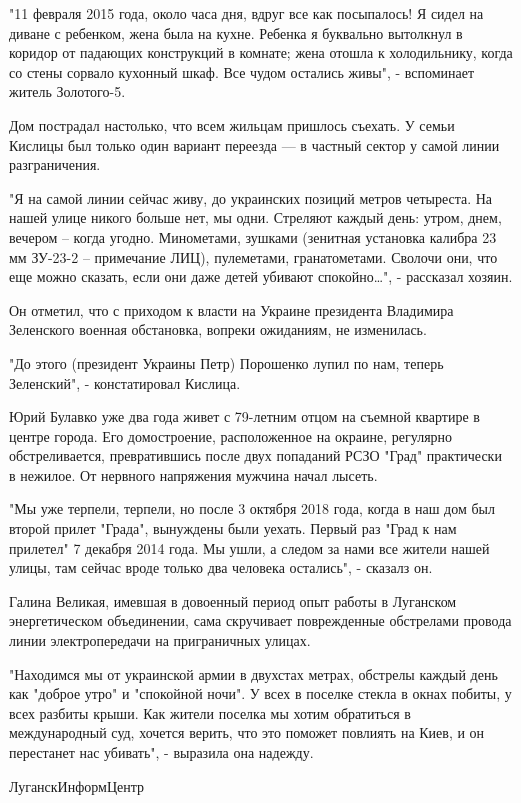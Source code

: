 \documentclass[a4paper,11pt]{extreport}
\begin{document}
"11 февраля 2015 года, около часа дня, вдруг все как посыпалось! Я сидел на
диване с ребенком, жена была на кухне. Ребенка я буквально вытолкнул в коридор
от падающих конструкций в комнате; жена отошла к холодильнику, когда со стены
сорвало кухонный шкаф. Все чудом остались живы", - вспоминает житель
Золотого-5. 

Дом пострадал настолько, что всем жильцам пришлось съехать. У семьи Кислицы был
только один вариант переезда --- в частный сектор у самой линии разграничения. 

"Я на самой линии сейчас живу, до украинских позиций метров четыреста. На нашей
улице никого больше нет, мы одни. Стреляют каждый день: утром, днем, вечером –
когда угодно. Минометами, зушками (зенитная установка калибра 23 мм ЗУ-23-2 –
примечание ЛИЦ), пулеметами, гранатометами. Сволочи они, что еще можно сказать,
если они даже детей убивают спокойно…", - рассказал хозяин. 

Он отметил, что с приходом к власти на Украине президента Владимира Зеленского
военная обстановка, вопреки ожиданиям, не изменилась. 

"До этого (президент Украины Петр) Порошенко лупил по нам, теперь Зеленский", -
констатировал Кислица. 

Юрий Булавко уже два года живет с 79-летним отцом на съемной квартире в центре
города. Его домостроение, расположенное на окраине, регулярно обстреливается,
превратившись после двух попаданий РСЗО "Град" практически в нежилое. От
нервного напряжения мужчина начал лысеть. 

"Мы уже терпели, терпели, но после 3 октября 2018 года, когда в наш дом был
второй прилет "Града", вынуждены были уехать. Первый раз "Град к нам прилетел"
7 декабря 2014 года. Мы ушли, а следом за нами все жители нашей улицы, там
сейчас вроде только два человека остались", - сказалз он. 

Галина Великая, имевшая в довоенный период опыт работы в Луганском
энергетическом объединении, сама скручивает поврежденные обстрелами провода
линии электропередачи на приграничных улицах. 

"Находимся мы от украинской армии в двухстах метрах, обстрелы каждый день как
"доброе утро" и "спокойной ночи". У всех в поселке стекла в окнах побиты, у
всех разбиты крыши. Как жители поселка мы хотим обратиться в международный суд,
хочется верить, что это поможет повлиять на Киев, и он перестанет нас убивать",
- выразила она надежду. 



ЛуганскИнформЦентр
  
\end{document}
